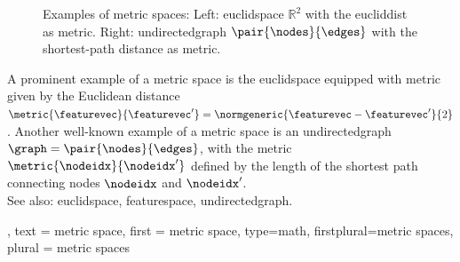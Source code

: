 {{\begin{figure}[H]
		\caption{Examples of metric spaces: Left: \gls{euclidspace} $\mathbb{R}^2$ with 
		the \gls{eucliddist} as metric. Right: \gls{undirectedgraph} $\pair{\nodes}{\edges}$ with 
		the shortest-path distance as metric.\label{fig:metric_space_examples_dict}}
	     \end{figure}
		A prominent example of a metric space 
		is the \gls{euclidspace} equipped with metric given by the Euclidean distance 
		$\metric{\featurevec}{\featurevec'} = \normgeneric{\featurevec - \featurevec'}{2}$. 
		Another well-known example of a metric space is an \gls{undirectedgraph}  
        $\graph=\pair{\nodes}{\edges}$, with the metric $\metric{\nodeidx}{\nodeidx'}$ 
		defined by the length of the shortest path connecting nodes $\nodeidx$ and $\nodeidx'$. 
			\\
		See also: \gls{euclidspace}, \gls{featurespace}, \gls{undirectedgraph}. },
    text = {metric space}, 
	first = {metric space}, 
	type=math, 
	firstplural={metric spaces}, 
	plural = {metric spaces}
}


